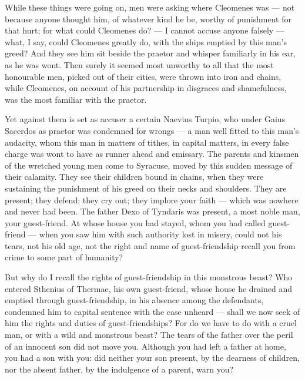  While these things were going on, men were asking where Cleomenes was --- not because anyone thought him, of whatever kind he be, worthy of punishment for that hurt; for what could Cleomenes do? --- I cannot accuse anyone falsely --- what, I say, could Cleomenes greatly do, with the ships emptied by this man's greed? And they see him sit beside the praetor and whisper familiarly in his ear, as he was wont. Then surely it seemed most unworthy to all that the most honourable men, picked out of their cities, were thrown into iron and chains, while Cleomenes, on account of his partnership in disgraces and shamefulness, was the most familiar with the praetor.

 Yet against them is set as accuser a certain Naevius Turpio, who under Gaius Sacerdos as praetor was condemned for wrongs --- a man well fitted to this man's audacity, whom this man in matters of tithes, in capital matters, in every false charge was wont to have as runner ahead and emissary. The parents and kinsmen of the wretched young men come to Syracuse, moved by this sudden message of their calamity. They see their children bound in chains, when they were sustaining the punishment of his greed on their necks and shoulders. They are present; they defend; they cry out; they implore your faith --- which was nowhere and never had been. The father Dexo of Tyndaris was present, a most noble man, your guest-friend. At whose house you had stayed, whom you had called guest-friend --- when you saw him with such authority lost in misery, could not his tears, not his old age, not the right and name of guest-friendship recall you from crime to some part of humanity?

 But why do I recall the rights of guest-friendship in this monstrous beast? Who entered Sthenius of Thermae, his own guest-friend, whose house he drained and emptied through guest-friendship, in his absence among the defendants, condemned him to capital sentence with the case unheard --- shall we now seek of him the rights and duties of guest-friendships? For do we have to do with a cruel man, or with a wild and monstrous beast? The tears of the father over the peril of an innocent son did not move you. Although you had left a father at home, you had a son with you: did neither your son present, by the dearness of children, nor the absent father, by the indulgence of a parent, warn you?

